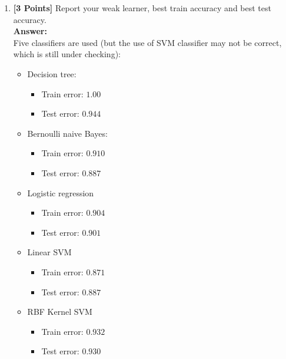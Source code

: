 \documentclass{article}
\begin{document}
\begin{enumerate}
	\item \textbf{[3 Points]} Report your weak learner, best train accuracy and best test accuracy.\\
	\textbf{Answer:}\\
	Five classifiers are used (but the use of SVM classifier may not be correct, which is still under checking):
	\begin{itemize}
		\item Decision tree:
		\begin{itemize}
			\item Train error: $1.00$
			\item Test error: $0.944$
		\end{itemize}
		\item Bernoulli naive Bayes:
		\begin{itemize}
			\item Train error: $0.910$
			\item Test error: $0.887$
		\end{itemize}
		\item Logistic regression
		\begin{itemize}
			\item Train error: $0.904$
			\item Test error: $0.901$
		\end{itemize}
		\item Linear SVM
		\begin{itemize}
			\item Train error: $0.871$
			\item Test error: $0.887$
		\end{itemize}
		\item RBF Kernel SVM
		\begin{itemize}
			\item Train error: $0.932$
			\item Test error: $0.930$
		\end{itemize}
	\end{itemize}
	

\end{enumerate}
\end{document}
